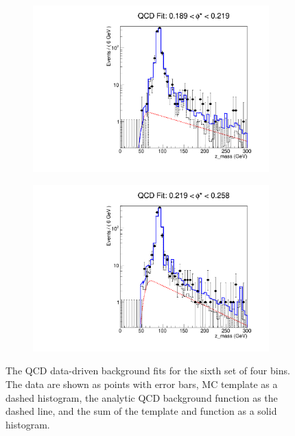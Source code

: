 \begin{figure}[!htbp]
\begin{subfigure}[b]{0.5\textwidth}
        \includegraphics[width=\linewidth]{figures/qcd_fits/qcd_fit_plot_for_23.pdf}
        \caption{}
        \label{fig:qcd_fit_23}
    \end{subfigure}%
    \begin{subfigure}[b]{0.5\textwidth}
        \includegraphics[width=\linewidth]{figures/qcd_fits/qcd_fit_plot_for_24.pdf}
        \caption{}
        \label{fig:qcd_fit_24}
    \end{subfigure}
    \caption{
       The QCD data-driven background fits for the sixth set of four \phistar
       bins. The data are shown as points with error bars, MC template as a
       dashed histogram, the analytic QCD background function as the dashed
       line, and the sum of the template and function as a solid histogram.
    }
    \label{fig:qcd_many_6}
\end{figure}

